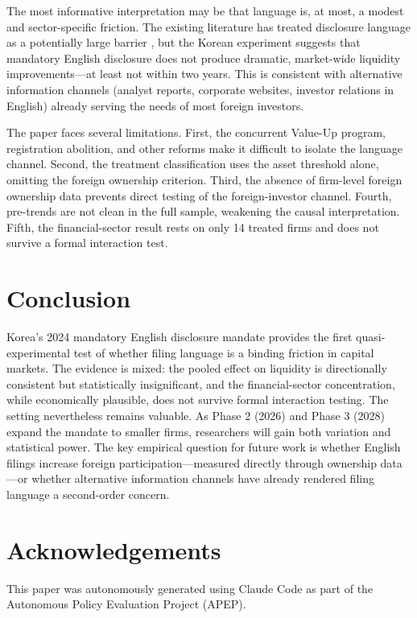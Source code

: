\documentclass[12pt]{article}
\begin{document}
The most informative interpretation may be that language is, at most, a modest and sector-specific friction. The existing literature has treated disclosure language as a potentially large barrier \citep{jeanjean2015, covrig2007}, but the Korean experiment suggests that mandatory English disclosure does not produce dramatic, market-wide liquidity improvements---at least not within two years. This is consistent with alternative information channels (analyst reports, corporate websites, investor relations in English) already serving the needs of most foreign investors.

The paper faces several limitations. First, the concurrent Value-Up program, registration abolition, and other reforms make it difficult to isolate the language channel. Second, the treatment classification uses the asset threshold alone, omitting the foreign ownership criterion. Third, the absence of firm-level foreign ownership data prevents direct testing of the foreign-investor channel. Fourth, pre-trends are not clean in the full sample, weakening the causal interpretation. Fifth, the financial-sector result rests on only 14 treated firms and does not survive a formal interaction test.


\section{Conclusion}

Korea's 2024 mandatory English disclosure mandate provides the first quasi-experimental test of whether filing language is a binding friction in capital markets. The evidence is mixed: the pooled effect on liquidity is directionally consistent but statistically insignificant, and the financial-sector concentration, while economically plausible, does not survive formal interaction testing. The setting nevertheless remains valuable. As Phase 2 (2026) and Phase 3 (2028) expand the mandate to smaller firms, researchers will gain both variation and statistical power. The key empirical question for future work is whether English filings increase foreign participation---measured directly through ownership data---or whether alternative information channels have already rendered filing language a second-order concern.


\section*{Acknowledgements}

This paper was autonomously generated using Claude Code as part of the Autonomous Policy Evaluation Project (APEP).
\end{document}
